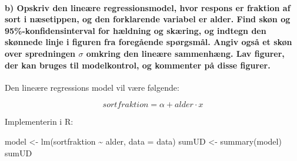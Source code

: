\documentclass[
]{article}
\newenvironment{Shaded}{\begin{snugshade}}{\end{snugshade}}
\newcommand{\AttributeTok}[1]{\textcolor[rgb]{0.77,0.63,0.00}{#1}}
\newcommand{\FunctionTok}[1]{\textcolor[rgb]{0.00,0.00,0.00}{#1}}
\newcommand{\NormalTok}[1]{#1}
\newcommand{\OtherTok}[1]{\textcolor[rgb]{0.56,0.35,0.01}{#1}}
\newcommand{\SpecialCharTok}[1]{\textcolor[rgb]{0.00,0.00,0.00}{#1}}
\begin{document}
\hypertarget{b-opskriv-den-lineuxe6re-regressionsmodel-hvor-respons-er-fraktion-af-sort-i-nuxe6setippen-og-den-forklarende-variabel-er-alder.-find-skuxf8n-og-95-konfidensinterval-for-huxe6ldning-og-skuxe6ring-og-indtegn-den-skuxf8nnede-linje-i-figuren-fra-foreguxe5ende-spuxf8rgsmuxe5l.-angiv-ogsuxe5-et-skuxf8n-over-spredningen-sigma-omkring-den-lineuxe6re-sammenhuxe6ng.-lav-figurer-der-kan-bruges-til-modelkontrol-og-kommenter-puxe5-disse-figurer.}{%
\paragraph{\texorpdfstring{b) Opskriv den lineære regressionsmodel, hvor
respons er fraktion af sort i næsetippen, og den forklarende variabel er
alder. Find skøn og 95\%-konfidensinterval for hældning og skæring, og
indtegn den skønnede linje i figuren fra foregående spørgsmål. Angiv
også et skøn over spredningen \(\sigma\) omkring den lineære sammenhæng.
Lav figurer, der kan bruges til modelkontrol, og kommenter på disse
figurer.}{b) Opskriv den lineære regressionsmodel, hvor respons er fraktion af sort i næsetippen, og den forklarende variabel er alder. Find skøn og 95\%-konfidensinterval for hældning og skæring, og indtegn den skønnede linje i figuren fra foregående spørgsmål. Angiv også et skøn over spredningen \textbackslash sigma omkring den lineære sammenhæng. Lav figurer, der kan bruges til modelkontrol, og kommenter på disse figurer.}}\label{b-opskriv-den-lineuxe6re-regressionsmodel-hvor-respons-er-fraktion-af-sort-i-nuxe6setippen-og-den-forklarende-variabel-er-alder.-find-skuxf8n-og-95-konfidensinterval-for-huxe6ldning-og-skuxe6ring-og-indtegn-den-skuxf8nnede-linje-i-figuren-fra-foreguxe5ende-spuxf8rgsmuxe5l.-angiv-ogsuxe5-et-skuxf8n-over-spredningen-sigma-omkring-den-lineuxe6re-sammenhuxe6ng.-lav-figurer-der-kan-bruges-til-modelkontrol-og-kommenter-puxe5-disse-figurer.}}

Den lineære regressions model vil være følgende:

\[
sortfraktion = \alpha + alder \cdot x
\]

Implementerin i R:

\begin{Shaded}
\begin{Highlighting}[]
\NormalTok{model }\OtherTok{\textless{}{-}} \FunctionTok{lm}\NormalTok{(sortfraktion }\SpecialCharTok{\textasciitilde{}}\NormalTok{ alder, }\AttributeTok{data =}\NormalTok{ data)}
\NormalTok{sumUD }\OtherTok{\textless{}{-}} \FunctionTok{summary}\NormalTok{(model)}
\NormalTok{sumUD}
\end{Highlighting}
\end{Shaded}
\end{document}
